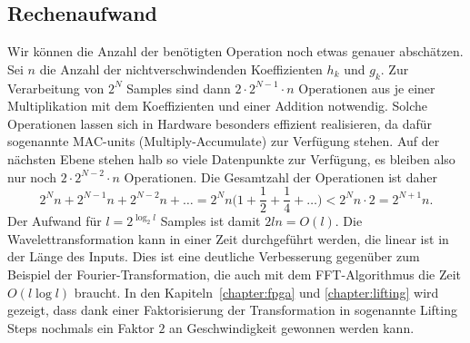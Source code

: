 \subsection{Rechenaufwand}
Wir können die Anzahl der benötigten Operation noch etwas genauer abschätzen.
Sei $n$ die Anzahl der nichtverschwindenden Koeffizienten $h_k$ und $g_k$.
Zur Verarbeitung von $2^N$ Samples sind dann $2\cdot 2^{N-1}\cdot n$
Operationen aus je einer Multiplikation mit dem Koeffizienten und
einer Addition notwendig.
Solche Operationen lassen sich in Hardware besonders effizient realisieren,
da dafür sogenannte MAC-units (Multiply-Accumulate) zur Verfügung stehen.
Auf der nächsten Ebene stehen halb so viele Datenpunkte zur Verfügung,
es bleiben also nur noch $2\cdot 2^{N-2}\cdot n$ Operationen.
Die Gesamtzahl der Operationen ist daher
\[
2^Nn + 2^{N-1}n + 2^{N-2}n+\dots
=
2^Nn\biggl(1+\frac12+\frac14+\dots\biggr)
<
2^Nn\cdot 2
=
2^{N+1}n.
\]
Der Aufwand für $l=2^{\log_2 l}$ Samples ist damit $2ln = O(l)$.
Die Wavelettransformation kann in einer Zeit durchgeführt werden, die 
linear ist in der Länge des Inputs.
Dies ist eine deutliche Verbesserung gegenüber zum Beispiel der
Fourier-Transformation, die auch mit dem FFT-Algorithmus die Zeit
$O(l\log l)$ braucht.
In den Kapiteln~\ref{chapter:fpga} und \ref{chapter:lifting} wird gezeigt,
dass dank einer Faktorisierung der Transformation in sogenannte Lifting Steps
nochmals ein Faktor $2$ an Geschwindigkeit gewonnen werden kann.

